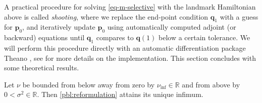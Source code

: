 \documentclass[runningheads]{llncs}
\newcommand{\nuinf}{\nu_\text{inf}}
\begin{document}
A practical procedure for solving
\eqref{eq-m-selective} with the landmark Hamiltonian above is called
\emph{shooting}, where we replace the end-point condition $\mathbf q_1$ with a
guess for $\mathbf p_0$, and iteratively update $\mathbf p_0$ using
automatically computed adjoint (or backward) equations until $\mathbf q_1$
compares to $\mathbf q(1)$ below a certain tolerance. We will perform this
procedure directly with an automatic differentiation package Theano
\cite{team2016theano}, see \cite{kuhnel2017computational,kuhnel2017differential}
for more details on the implementation. This section concludes with some
theoretical results.
\begin{theorem}\label{sm-eu}
Let $\nu$ be bounded from below away from zero by $\nuinf \in \mathbb R$ and
from above by $0<\sigma^2\in\mathbb R$. Then \eqref{pbl:reformulation} attains
its unique infimum.
\end{theorem}
\end{document}
